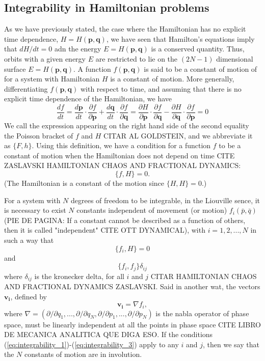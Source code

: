 \subsection{Integrability in Hamiltonian problems}
As we have previously stated, the case where the Hamiltonian has no explicit time dependence, $H=H(\bm{p},\bm{q})$, we have seen that Hamilton's equations imply that $dH/dt=0$ adn the energy $E=H(\bm{p},\bm{q})$ is a conserved quantity. Thus, orbits with a given energy $E$ are restricted to lie on the $(2N-1)$ dimensional surface $E=H(\bm{p},\bm{q})$. A function $f(\bm{p},\bm{q})$ is said to be a constant of motion of for a system with Hamiltonian $H$ is a constant of motion. More generally, differentiating $f(\bm{p},\bm{q})$ with respect to time, and assuming that there is no explicit time dependence of the Hamiltonian, we have
\begin{equation}
\frac{df}{dt}=\frac{d\bm{p}}{dt}\cdot\frac{\partial f}{\partial \bm{p}}+\frac{d\bm{q}}{dt}\cdot\frac{\partial f}{\partial \bm{q}}= \frac{\partial H}{\partial \bm{p}}\cdot\frac{\partial f}{\partial \bm{q}}-\frac{\partial H}{\partial \bm{q}}\cdot\frac{\partial f}{\partial \bm{p}}=0
\end{equation}
We call the expression appearing on the right hand side of the second equality the Poisson bracket of $f$ and $H$ CITAR AL GOLDSTEIN, and we abbreviate it as $\{F,h\}$. Using this definition, we have a condition for a function $f$ to be a constant of motion when the Hamiltonian does not depend on time CITE ZASLAVSKI HAMILTONIAN CHAOS AND FRACTIONAL DYNAMICS:
\begin{equation}
\{ f,H\} =0.
\end{equation}
(The Hamiltonian is a constant of the motion since $\{H,H\}=0$.)\par


For a system with $N$ degrees of freedom to be integrable, in the Liouville sence, it is necessary to exist $N$ constants independent of movement (or motion) $f_i(\bar{p},\bar{q})$(PIE DE PAGINA: If a constant cannot be described as a function of others, then it is called "independent" CITE OTT DYNAMICAL), with $i=1,2,...,N$ in such a way that
\begin{equation}
\{f_i,H\}=0
\label{eq:integrability_1}
\end{equation}
and 
\begin{equation}
\{f_i,f_j\}\delta_{ij}
\label{eq:integrability_2}
\end{equation}
where $\delta_{ij}$ is the kronecker delta, for all $i$ and $j$ CITAR HAMILTONIAN CHAOS AND FRACTIONAL DYNAMICS ZASLAVSKI. Said in another wat, the vectors $\bm{v_i}$, defined by
\begin{equation}
\bm{v_i}=\nabla f_i,
\label{eq:integrability_3}
\end{equation}
where $\nabla=(\partial/\partial q_1,...,\partial/\partial q_N,\partial/\partial p_1,...,\partial/\partial p_N)$ is the nabla operator of phase space, must be linearly independent at all the points in phase space CITE LIBRO DE MECANICA ANALITICA QUE DIGA ESO. If the conditions (\ref{eq:integrability_1})-(\ref{eq:integrability_3}) apply to any $i$ and $j$, then we say that the $N$ constants of motion are in involution.\par 

